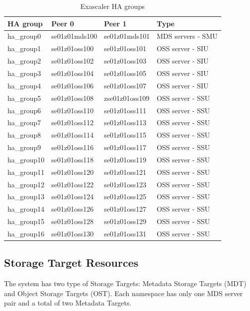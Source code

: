\documentclass{article}
\begin{document}
\begin{table}[htbp]
\centering
\begin{tabular}{|l|l|l|l|}
    \hline
    \textbf{HA group} & \textbf{Peer 0} & \textbf{Peer 1} & \textbf{Type}\\
    \hline
    ha\_group0 & se01z01mds100 & se01z01mds101 & MDS servers - SMU \\
    ha\_group1 & se01z01oss100 & se01z01oss101 & OSS server - SIU\\
    ha\_group2 & se01z01oss102 & se01z01oss103 & OSS server - SIU\\
    ha\_group3 & se01z01oss104 & se01z01oss105 & OSS server - SIU\\
    ha\_group4 & se01z01oss106 & se01z01oss107 & OSS server - SIU\\
    ha\_group5 & se01z01oss108 & zse01z01oss109 & OSS server - SSU\\
    ha\_group6 & se01z01oss110 & se01z01oss111 & OSS server - SSU\\
    ha\_group7 & se01z01oss112 & se01z01oss113 & OSS server - SSU\\
    ha\_group8 & se01z01oss114 & se01z01oss115 & OSS server - SSU\\
    ha\_group9 & se01z01oss116 & se01z01oss117 & OSS server - SSU\\
    ha\_group10 & se01z01oss118 & se01z01oss119 & OSS server - SSU\\
    ha\_group11 & se01z01oss120 & se01z01oss121 & OSS server - SSU\\
    ha\_group12 & se01z01oss122 & se01z01oss123 & OSS server - SSU\\
    ha\_group13 & se01z01oss124 & se01z01oss125 & OSS server - SSU\\
    ha\_group14 & se01z01oss126 & se01z01oss127 & OSS server - SSU\\
    ha\_group15 & se01z01oss128 & se01z01oss129 & OSS server - SSU\\
    ha\_group16 & se01z01oss130 & se01z01oss131 & OSS server - SSU\\
    \hline
\end{tabular}
\caption{Exascaler HA groups}
\label{tab:es-ha-groups}
\end{table}

\subsection{Storage Target Resources}
The system has two type of Storage Targets: Metadata Storage Targets (MDT) and Object Storage Targets (OST). Each namespace has only one MDS server pair and a total of two Metadata Targets. 
\end{document}
